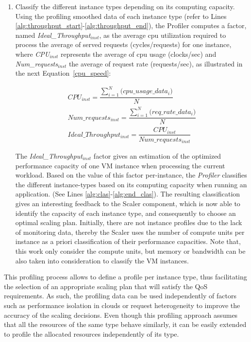\begin{enumerate}
\item Classify the different instance types depending on its computing capacity. Using the profiling smoothed data of each instance type (refer to Lines \ref{alg:throughput_start}-\ref{alg:throughput_end}), the Profiler computes a factor, named \emph{Ideal\_Throughput$_{inst}$}, as the average cpu utilization required to process the average of served requests (cycles/requests) for one instance, where \emph{CPU$_{inst}$} represents the average of  cpu usage (clocks/sec) and \emph{Num\_requests$_{inst}$} the average of request rate (requests/sec), as illustrated in the next Equation~\ref{cpu_speed}:

{\scriptsize
\begin{equation}\label{cpu_speed}
\begin{split}
CPU_{inst} = \dfrac{   \sum_{i=1}^N \big( cpu\_usage\_data_{i}  \big) } { N } \\
Num\_requests_{inst} = \dfrac{   \sum_{i=1}^N \big( req\_rate\_data_{i} \big) } { N } \\
Ideal\_Throughput_{inst} =\dfrac{   CPU_{inst}  } {  Num\_requests_{inst}  } 
\end{split}
\end{equation}
}

The \emph{Ideal\_Throughput$_{inst}$} factor gives an estimation of the optimized performance capacity of one VM instance when processing the current workload. Based on the value of this factor per-instance, the \emph{Profiler} classifies the different instance-types based on its computing capacity when running an application. (See Lines \ref{alg:clas}-\ref{alg:end_clas}). The resulting classification gives an interesting feedback to the Scaler component, which is now able to identify the capacity of each instance type, and consequently to choose an optimal scaling plan. Initially, there are not instance profiles due to the lack of monitoring data, thereby the Scaler uses the number of compute units per instance as a priori classification of their performance capacities. Note that, this work only consider the compute units, but memory or bandwidth can be also taken into consideration to classify the VM instances.
\end{enumerate}

This profiling process allows to define a profile per instance type, thus facilitating the selection of an appropriate scaling plan that will satisfy the QoS requirements. As such, the profiling data can be used independently of factors such as performance isolation in clouds or request heterogeneity to improve the accuracy of the scaling decisions. Even though this profiling approach assumes that all the resources of the same type behave similarly, it can be easily extended to profile the allocated resources independently of its type.



